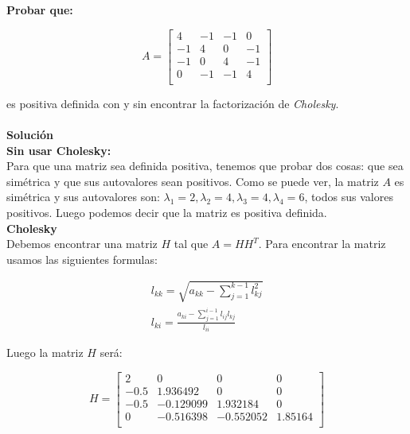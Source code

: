 \textbf{Probar que:\\}
    
    \[
        A = \begin{bmatrix}
            4 & -1 & -1 & 0\\
            -1 & 4 & 0 & -1\\
            -1 & 0 & 4 & -1\\
            0 & -1 & -1 & 4\\
        \end{bmatrix}
    \]
    
    es positiva definida con y sin encontrar la factorización de \textit{Cholesky}.\\\\
    
    \textbf{Solución}\\
    
    \textbf{Sin usar Cholesky:}\\
    
    Para que una matriz sea definida positiva, tenemos que probar dos cosas: que sea simétrica y que sus autovalores sean positivos. Como se puede ver, la matriz $A$ es simétrica y sus autovalores son: $\lambda_1 = 2, \lambda_2 = 4, \lambda_3 = 4, \lambda_4 = 6$, todos sus valores positivos. Luego podemos decir que la matriz es positiva definida.\\
        
    \textbf{Cholesky}\\
    
    Debemos encontrar una matriz $H$ tal que $A = H H^T$.
    Para encontrar la matriz usamos las siguientes formulas:
        
        \begin{equation*}
            \begin{split}
                l_{kk} = \sqrt{a_{kk} - \sum_{j=1}^{k-1} l_{kj} ^ 2}\\
                l_{ki} = \frac{a_{ki} - \sum_{j=1}^{i-1} l_{ij} l_{kj} }{l_{ii}}
            \end{split}
        \end{equation*}
        
        Luego la matriz $H$ será:
        
        \[
        H = \begin{bmatrix}
            2 & 0 & 0 & 0\\
            -0.5 & 1.936492 & 0 & 0\\
            -0.5 & -0.129099 & 1.932184 & 0 \\
            0 & -0.516398 & -0.552052 & 1.85164\\
        \end{bmatrix}
       \]
    
